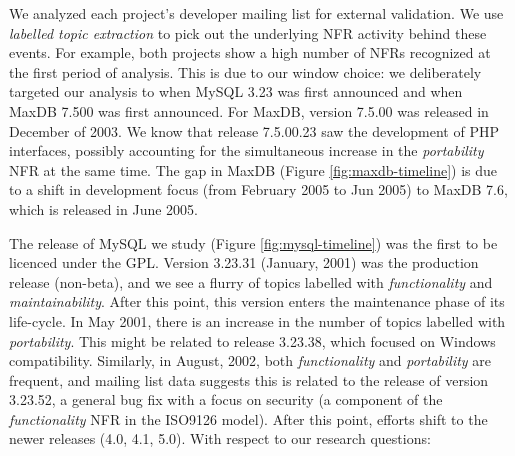 \documentclass[]{sig-alternate}
\begin{document}
We analyzed each project's developer mailing list for external validation. 
We use \textit{labelled topic extraction} to pick out the underlying NFR activity behind these events. 
For example, both projects show a high number of NFRs recognized at the first period of analysis. 
This is due to our window choice: we deliberately targeted our analysis to when MySQL 3.23 was first announced %
and when MaxDB 7.500 was first announced. For MaxDB, version 7.5.00  was released in December of 2003. 
We know that release 7.5.00.23 saw the development of PHP interfaces, possibly accounting for the simultaneous increase in the \emph{portability} NFR at the same time.
The gap in MaxDB (Figure \ref{fig:maxdb-timeline}) is due to a shift in development focus (from February 2005 to Jun 2005) to MaxDB 7.6, which is released in June 2005.

The release of MySQL we study  (Figure \ref{fig:mysql-timeline}) was the first to be licenced under the GPL. 
Version 3.23.31 (January, 2001) was the production release (non-beta), and we see a flurry of topics labelled with \emph{functionality} and \emph{maintainability}. 
After this point, this version enters the maintenance phase of its life-cycle. 
In May 2001, there is an increase in the number of topics labelled with \emph{portability}. 
This might be related to release 3.23.38, which focused on Windows compatibility. 
Similarly, in August, 2002, both \emph{functionality} and \emph{portability} are frequent, and mailing list data suggests this is related to the release of version 3.23.52, a general bug fix with a focus on security (a component of the \emph{functionality} NFR in the ISO9126 model). 
After this point, efforts shift to the newer releases (4.0, 4.1, 5.0). With respect to our research questions:

\end{document}
